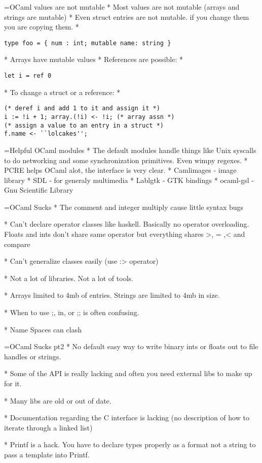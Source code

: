 \documentclass[titlepage,usenames,a4,landscape,semhelv]{seminar}
\begin{document}
\begin{slide}
=OCaml values are not mutable
* Most values are not mutable (arrays and strings are mutable)
* Even struct entries are not mutable. if you change them you are copying them.
        * \begin{verbatim}type foo = { num : int; mutable name: string }\end{verbatim}
* Arrays have mutable values
* References are possible: 
        * \begin{verbatim}let i = ref 0\end{verbatim}
* To change a struct or a reference:
        * \begin{verbatim}
(* deref i and add 1 to it and assign it *)
i := !i + 1; array.(!i) <- !i; (* array assn *)
(* assign a value to an entry in a struct *)
f.name <- ``lolcakes'';
\end{verbatim}


=Helpful OCaml modules
* The default modules handle things like Unix syscalls to do networking and some synchronization primitives. Even wimpy regexes.
* PCRE helps OCaml alot, the interface is very clear.
* Camlimages - image library
* SDL - for generaly multimedia
* Lablgtk - GTK bindings
* ocaml-gsl - Gnu Scientific Library

=OCaml Sucks 
* The comment and integer multiply cause little syntax
bugs

* Can't declare operator classes like haskell. Basically no operator
overloading. Floats and ints don't share same operator but everything
shares >, = ,< and compare

* Can't generalize classes easily (use :> operator)

* Not a lot of libraries. Not a lot of tools.

* Arrays limited to 4mb of entries. Strings are limited to 4mb in size.

* When to use ;, in, or ;; is often confusing.

* Name Spaces can clash

=OCaml Sucks pt2
* No default easy way to write binary ints or floats out to file handles or strings. 

* Some of the API is really lacking and often you need external libs to make up for it.

* Many libs are old or out of date.

* Documentation regarding the C interface is lacking (no description of how to iterate through a linked list)

* Printf is a hack. You have to declare types properly as a format not
a string to pass a template into Printf.


\end{slide}
\end{document}

